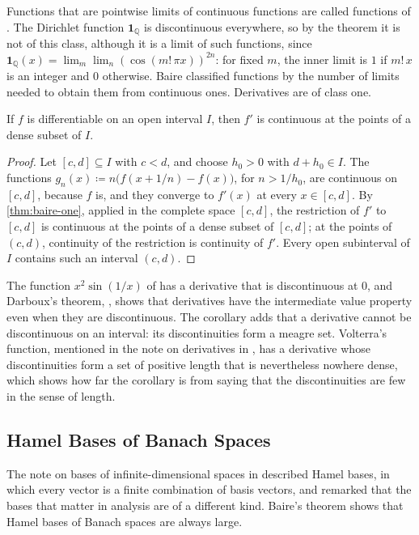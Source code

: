 Functions that are pointwise limits of continuous functions are called functions of . The Dirichlet function $\mathbf 1_{\mathbb Q}$ is discontinuous everywhere, so by the theorem it is not of this class, although it is a limit of such functions, since $\mathbf 1_{\mathbb Q}(x)=\lim_m\lim_n(\cos(m!\,\pi x))^{2n}$: for fixed $m$, the inner limit is $1$ if $m!\,x$ is an integer and $0$ otherwise. Baire classified functions by the number of limits needed to obtain them from continuous ones. Derivatives are of class one.

\begin{corollary}
\label{cor:derivative-continuity}
If $f$ is differentiable on an open interval $I$, then $f'$ is continuous at the points of a dense subset of $I$.
\end{corollary}

\begin{proof}
Let $[c,d]\subseteq I$ with $c<d$, and choose $h_0>0$ with $d+h_0\in I$. The functions $g_n(x)\coloneqq n\bigl(f(x+1/n)-f(x)\bigr)$, for $n>1/h_0$, are continuous on $[c,d]$, because $f$ is, and they converge to $f'(x)$ at every $x\in[c,d]$. By \cref{thm:baire-one}, applied in the complete space $[c,d]$, the restriction of $f'$ to $[c,d]$ is continuous at the points of a dense subset of $[c,d]$; at the points of $(c,d)$, continuity of the restriction is continuity of $f'$. Every open subinterval of $I$ contains such an interval $(c,d)$.
\end{proof}

The function $x^2\sin(1/x)$ of  has a derivative that is discontinuous at $0$, and Darboux's theorem, , shows that derivatives have the intermediate value property even when they are discontinuous. The corollary adds that a derivative cannot be discontinuous on an interval: its discontinuities form a meagre set. Volterra's function, mentioned in the note on derivatives in , has a derivative whose discontinuities form a set of positive length that is nevertheless nowhere dense, which shows how far the corollary is from saying that the discontinuities are few in the sense of length.

\subsection{Hamel Bases of Banach Spaces}

The note on bases of infinite-dimensional spaces in  described Hamel bases, in which every vector is a finite combination of basis vectors, and remarked that the bases that matter in analysis are of a different kind. Baire's theorem shows that Hamel bases of Banach spaces are always large.

